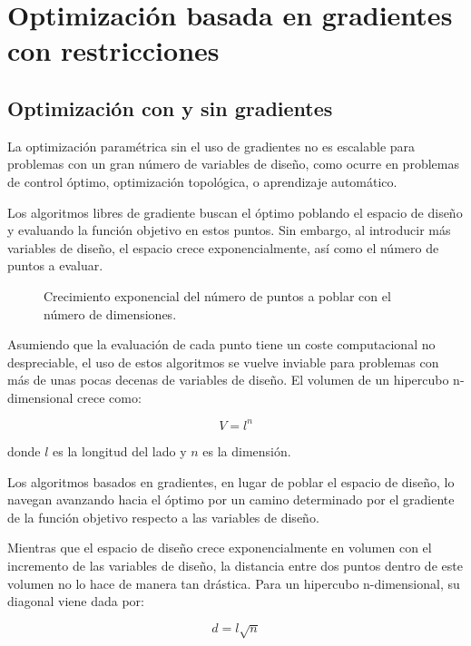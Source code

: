 \section{Optimización basada en gradientes con restricciones}

\subsection{Optimización con y sin gradientes}

La optimización paramétrica sin el uso de gradientes no es escalable para
problemas con un gran número de variables de diseño, como ocurre en problemas
de control óptimo, optimización topológica, o aprendizaje automático.

Los algoritmos libres de gradiente buscan el óptimo poblando el espacio de
diseño y evaluando la función objetivo en estos puntos. Sin embargo, al
introducir más variables de diseño, el espacio crece exponencialmente, así como
el número de puntos a evaluar.

\begin{figure}[h] \centering
	\centering
	
	\caption{Crecimiento exponencial del número de puntos a poblar con el número de dimensiones.}
	\label{fig:hypercube}
\end{figure}

Asumiendo que la evaluación de cada punto tiene un coste computacional no
despreciable, el uso de estos algoritmos se vuelve inviable para problemas con
más de unas pocas decenas de variables de diseño. El volumen de un hipercubo
n-dimensional crece como:

\begin{equation}
	V = l^n
\end{equation}

donde $l$ es la longitud del lado y $n$ es la dimensión.


Los algoritmos basados en gradientes, en lugar de poblar el espacio de
diseño, lo navegan avanzando hacia el óptimo por un camino determinado por
el gradiente de la función objetivo respecto a las variables de diseño.

Mientras que el espacio de diseño crece exponencialmente en volumen con el
incremento de las variables de diseño, la distancia entre dos puntos dentro
de este volumen no lo hace de manera tan drástica. Para un hipercubo
n-dimensional, su diagonal viene dada por:

\begin{equation}
	d = l\sqrt{n}
\end{equation}

